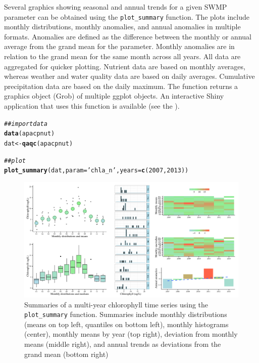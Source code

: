 \documentclass[10pt,letterpaper]{article}\usepackage[]{graphicx}\usepackage[]{color}
\makeatletter
\def\maxwidth{ %
  \ifdim\Gin@nat@width>\linewidth
    \linewidth
  \else
    \Gin@nat@width
  \fi
}
\newcommand{\hlnum}[1]{\textcolor[rgb]{0.686,0.059,0.569}{#1}}%
\newcommand{\hlstr}[1]{\textcolor[rgb]{0.192,0.494,0.8}{#1}}%
\newcommand{\hlcom}[1]{\textcolor[rgb]{0.678,0.584,0.686}{\textit{#1}}}%
\newcommand{\hlstd}[1]{\textcolor[rgb]{0.345,0.345,0.345}{#1}}%
\newcommand{\hlkwb}[1]{\textcolor[rgb]{0.69,0.353,0.396}{#1}}%
\newcommand{\hlkwc}[1]{\textcolor[rgb]{0.333,0.667,0.333}{#1}}%
\newcommand{\hlkwd}[1]{\textcolor[rgb]{0.737,0.353,0.396}{\textbf{#1}}}%
\newenvironment{kframe}{%
 \def\at@end@of@kframe{}%
 \ifinner\ifhmode%
  \def\at@end@of@kframe{\end{minipage}}%
  \begin{minipage}{\columnwidth}%
 \fi\fi%
 \def\FrameCommand##1{\hskip\@totalleftmargin \hskip-\fboxsep
 \colorbox{shadecolor}{##1}\hskip-\fboxsep
     \hskip-\linewidth \hskip-\@totalleftmargin \hskip\columnwidth}%
 \MakeFramed {\advance\hsize-\width
   \@totalleftmargin\z@ \linewidth\hsize
   \@setminipage}}%
 {\par\unskip\endMakeFramed%
 \at@end@of@kframe}
\newenvironment{knitrout}{}{} %
\makeatother
\begin{document}
Several graphics showing seasonal and annual trends for a given SWMP parameter can be obtained using the \texttt{plot\_summary} function.  The plots include monthly distributions, monthly anomalies, and annual anomalies in multiple formats.  Anomalies are defined as the difference between the monthly or annual average from the grand mean for the parameter.  Monthly anomalies are in relation to the grand mean for the same month across all years.  All data are aggregated for quicker plotting.  Nutrient data are based on monthly averages, whereas weather and water quality data are based on daily averages.  Cumulative precipitation data are based on the daily maximum. The function returns a graphics object (Grob) of multiple ggplot objects.  An interactive Shiny application \cite{shiny15} that uses this function is available (see the ).

\begin{knitrout}
\color{fgcolor}\begin{kframe}
\begin{alltt}
\hlcom{## import data}
\hlkwd{data}\hlstd{(apacpnut)}
\hlstd{dat} \hlkwb{<-} \hlkwd{qaqc}\hlstd{(apacpnut)}

\hlcom{## plot}
\hlkwd{plot_summary}\hlstd{(dat,} \hlkwc{param} \hlstd{=} \hlstr{'chla_n'}\hlstd{,} \hlkwc{years} \hlstd{=} \hlkwd{c}\hlstd{(}\hlnum{2007}\hlstd{,} \hlnum{2013}\hlstd{))}
\end{alltt}
\end{kframe}\begin{figure}[!ht]


{\centering \includegraphics[width=\maxwidth]{figure/summary_ex} 

}

\caption[Summaries of a multi-year chlorophyll time series using the \texttt{plot\_summary} function]{Summaries of a multi-year chlorophyll time series using the \texttt{plot\_summary} function.  Summaries include monthly distributions (means on top left, quantiles on bottom left), monthly histograms (center), monthly means by year (top right), deviation from monthly means (middle right), and annual trends as deviations from the grand mean (bottom right)\label{fig:summary_ex}}
\end{figure}


\end{knitrout}
\end{document}
